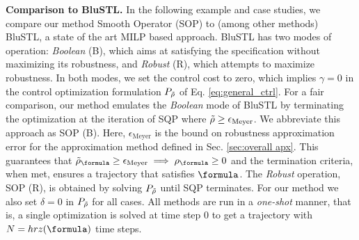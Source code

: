 \textbf{Comparison to BluSTL.}
In the following example and case studies, we compare our method Smooth Operator (SOP) to (among other methods) BluSTL, a state of the art MILP based approach. BluSTL has two modes of operation:  \textit{Boolean} (B), which aims at satisfying the specification without maximizing its robustness, and \textit{Robust} (R), which attempts to maximize robustness. 
In both modes, we set the control cost to zero, which implies $\gamma=0$ in the control optimization formulation $P_{\tilde{\rho}}$ of Eq. \ref{eq:general_ctrl}. For a fair comparison, our method emulates the \textit{Boolean} mode of BluSTL by terminating the optimization at the iteration of SQP where $\tilde{\rho} \geq \epsilon_{\text{Meyer}}$. We abbreviate this approach as SOP (B). Here, $\epsilon_{\text{Meyer}}$ is the bound on robustness approximation error for the approximation method defined in Sec. \ref{sec:overall apx}. This guarantees that $\srob_{\formula} \geq  \epsilon_{\text{Meyer}} \implies \rob_{\formula} \geq 0$ and the termination criteria, when met, ensures a trajectory that satisfies $\formula$.
The \textit{Robust} operation, SOP (R), is obtained by solving $P_{\tilde{\rho}}$ until SQP terminates. For our method we also set $\delta=0$ in $P_{\tilde{\rho}}$ for all cases.
All methods are run in a \textit{one-shot} manner, that is, a single optimization is solved at time step $0$ to get a trajectory with $N = hrz(\formula)$ time steps. 









%
